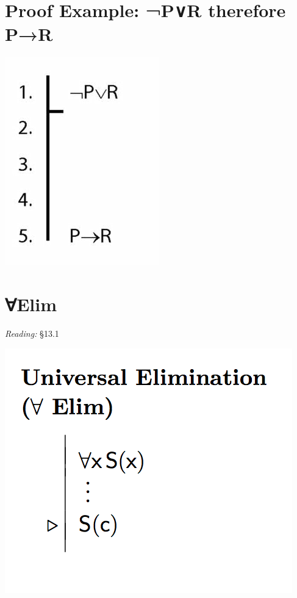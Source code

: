\documentclass[12pt]{extarticle}
\begin{document}
\begin{multicols*}{3}
 
 
\section{Proof Example: ¬P∨R therefore P→R}
 
\begin{center}
\includegraphics[scale=0.3]{img/unit_320_proof.png}
\end{center}
 
 
\section{∀Elim}
 
\emph{Reading:} §13.1
 
\begin{center}
\includegraphics[scale=0.3]{img/rule_universal_elim.png}
\end{center}


 


\end{multicols*}
\end{document}
